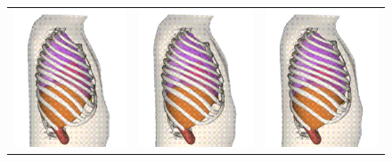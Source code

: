 \begin{figure}[h!]
    \begin{center}
	\begin{tabular}{c c c}
        \includegraphics[width=4cm]{images/resp1} & \includegraphics[width=4cm]{images/resp3} & \includegraphics[width=4cm]{images/resp5} \\

\end{tabular}
\end{center}
\end{figure}
